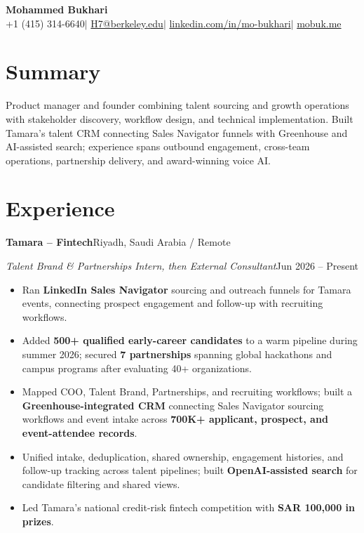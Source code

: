 \documentclass[a4paper,10pt]{article}
\newcommand{\entry}[4]{%
  \textbf{#1}\hfill #2\par
  \textit{#3}\hfill #4\par
}
\begin{document}
\begin{center}
  {\LARGE\bfseries Mohammed Bukhari}\\[3pt]
  +1 (415) 314-6640\enspace$|$\enspace
  \href{mailto:H7@berkeley.edu}{H7@berkeley.edu}\enspace$|$\enspace
  \href{https://www.linkedin.com/in/mo-bukhari/}{linkedin.com/in/mo-bukhari}\enspace$|$\enspace
  \href{https://mobuk.me}{mobuk.me}
\end{center}
\vspace{-5pt}

\section{Summary}
Product manager and founder combining talent sourcing and growth operations
with stakeholder discovery, workflow design, and technical implementation.
Built Tamara's talent CRM connecting Sales Navigator funnels with Greenhouse
and AI-assisted search; experience spans outbound engagement, cross-team
operations, partnership delivery, and award-winning voice AI.

\section{Experience}

\entry
{Tamara -- Fintech}
{Riyadh, Saudi Arabia / Remote}
{Talent Brand \& Partnerships Intern, then External Consultant}
{Jun 2026 -- Present}
\begin{itemize}
  \item Ran \textbf{LinkedIn Sales Navigator} sourcing and outreach funnels
  for Tamara events, connecting prospect engagement and follow-up with
  recruiting workflows.
  \item Added \textbf{500+ qualified early-career candidates} to a warm
  pipeline during summer 2026; secured \textbf{7 partnerships} spanning
  global hackathons and campus programs after evaluating 40+ organizations.
  \item Mapped COO, Talent Brand, Partnerships, and recruiting workflows;
  built a \textbf{Greenhouse-integrated CRM} connecting Sales Navigator
  sourcing workflows and event intake across \textbf{700K+ applicant,
  prospect, and event-attendee records}.
  \item Unified intake, deduplication, shared ownership, engagement
  histories, and follow-up tracking across talent pipelines; built
  \textbf{OpenAI-assisted search} for candidate filtering and shared views.
  \item Led Tamara's national credit-risk fintech competition with
  \textbf{SAR 100,000 in prizes}.
\end{itemize}
\end{document}
